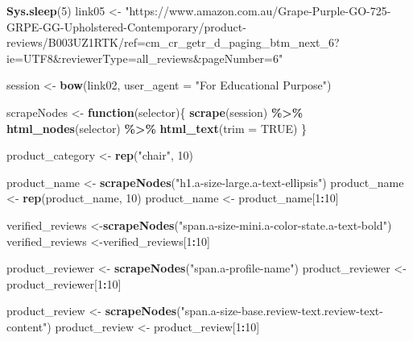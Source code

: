\documentclass[
]{article}
\newenvironment{Shaded}{\begin{snugshade}}{\end{snugshade}}
\newcommand{\AttributeTok}[1]{\textcolor[rgb]{0.13,0.29,0.53}{#1}}
\newcommand{\ConstantTok}[1]{\textcolor[rgb]{0.56,0.35,0.01}{#1}}
\newcommand{\ControlFlowTok}[1]{\textcolor[rgb]{0.13,0.29,0.53}{\textbf{#1}}}
\newcommand{\DecValTok}[1]{\textcolor[rgb]{0.00,0.00,0.81}{#1}}
\newcommand{\FunctionTok}[1]{\textcolor[rgb]{0.13,0.29,0.53}{\textbf{#1}}}
\newcommand{\NormalTok}[1]{#1}
\newcommand{\OtherTok}[1]{\textcolor[rgb]{0.56,0.35,0.01}{#1}}
\newcommand{\SpecialCharTok}[1]{\textcolor[rgb]{0.81,0.36,0.00}{\textbf{#1}}}
\newcommand{\StringTok}[1]{\textcolor[rgb]{0.31,0.60,0.02}{#1}}
\begin{document}
\begin{Shaded}
\begin{Highlighting}[]
   \FunctionTok{Sys.sleep}\NormalTok{(}\DecValTok{5}\NormalTok{)}
\NormalTok{link05 }\OtherTok{\textless{}{-}} \StringTok{"https://www.amazon.com.au/Grape{-}Purple{-}GO{-}725{-}GRPE{-}GG{-}Upholstered{-}Contemporary/product{-}reviews/B003UZ1RTK/ref=cm\_cr\_getr\_d\_paging\_btm\_next\_6?ie=UTF8\&reviewerType=all\_reviews\&pageNumber=6"}


\NormalTok{  session }\OtherTok{\textless{}{-}} \FunctionTok{bow}\NormalTok{(link02,}
               \AttributeTok{user\_agent =} \StringTok{"For Educational Purpose"}\NormalTok{)}

\NormalTok{  scrapeNodes }\OtherTok{\textless{}{-}} \ControlFlowTok{function}\NormalTok{(selector)\{}
    \FunctionTok{scrape}\NormalTok{(session) }\SpecialCharTok{\%\textgreater{}\%}
      \FunctionTok{html\_nodes}\NormalTok{(selector) }\SpecialCharTok{\%\textgreater{}\%}
      \FunctionTok{html\_text}\NormalTok{(}\AttributeTok{trim =} \ConstantTok{TRUE}\NormalTok{)}
\NormalTok{  \}}

\NormalTok{  product\_category }\OtherTok{\textless{}{-}} \FunctionTok{rep}\NormalTok{(}\StringTok{"chair"}\NormalTok{, }\DecValTok{10}\NormalTok{)}

\NormalTok{  product\_name }\OtherTok{\textless{}{-}} \FunctionTok{scrapeNodes}\NormalTok{(}\StringTok{"h1.a{-}size{-}large.a{-}text{-}ellipsis"}\NormalTok{)}
\NormalTok{  product\_name }\OtherTok{\textless{}{-}} \FunctionTok{rep}\NormalTok{(product\_name, }\DecValTok{10}\NormalTok{)}
\NormalTok{  product\_name }\OtherTok{\textless{}{-}}\NormalTok{ product\_name[}\DecValTok{1}\SpecialCharTok{:}\DecValTok{10}\NormalTok{]}
  
\NormalTok{  verified\_reviews }\OtherTok{\textless{}{-}}\FunctionTok{scrapeNodes}\NormalTok{(}\StringTok{"span.a{-}size{-}mini.a{-}color{-}state.a{-}text{-}bold"}\NormalTok{)}
\NormalTok{  verified\_reviews }\OtherTok{\textless{}{-}}\NormalTok{verified\_reviews[}\DecValTok{1}\SpecialCharTok{:}\DecValTok{10}\NormalTok{]}
  
\NormalTok{  product\_reviewer }\OtherTok{\textless{}{-}} \FunctionTok{scrapeNodes}\NormalTok{(}\StringTok{"span.a{-}profile{-}name"}\NormalTok{)}
\NormalTok{  product\_reviewer }\OtherTok{\textless{}{-}}\NormalTok{ product\_reviewer[}\DecValTok{1}\SpecialCharTok{:}\DecValTok{10}\NormalTok{]}
  
\NormalTok{  product\_review }\OtherTok{\textless{}{-}} \FunctionTok{scrapeNodes}\NormalTok{(}\StringTok{"span.a{-}size{-}base.review{-}text.review{-}text{-}content"}\NormalTok{)}
\NormalTok{  product\_review }\OtherTok{\textless{}{-}}\NormalTok{ product\_review[}\DecValTok{1}\SpecialCharTok{:}\DecValTok{10}\NormalTok{]}
  

\end{Highlighting}
\end{Shaded}
\end{document}
